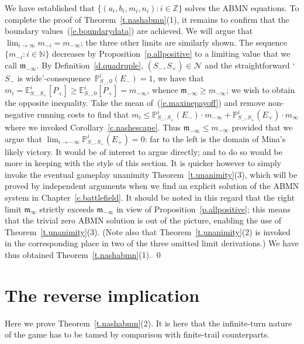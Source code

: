 \documentclass[letterpaper,11pt,oneside,reqno]{amsbook}
\newcommand{\PP}{\ensuremath{\mathbb{P}}}
\newcommand{\N}{\ensuremath{\mathbb{N}}}
\newcommand{\Z}{\ensuremath{\mathbb{Z}}}
\newcommand{\E}[0]{\mathbb{E}}
\numberwithin{figure}{chapter}
\newtheorem{proposition}[theorem]{Proposition}
\theoremstyle{definition}
\theoremstyle{definition}
\theoremstyle{definition}
\theoremstyle{definition}
\theoremstyle{definition}
\newcommand{\mc}{\mathcal}
\newcommand{\nwithzero}{\N}
\newcommand\pgameplay[3]{\PP^{#3}_{#1,#2}}
\newcommand\egameplay[3]{\E^{#3}_{#1,#2}}
\newcommand{\abmnmacspace}{\textrm{ABMN} }
\begin{document}
We have established that $\big\{ (a_i,b_i,m_i,n_i): i \in \Z \big\}$
solves the \abmnmacspace equations. 
To complete the proof of Theorem~\ref{t.nashabmn}(1), it remains to confirm that the boundary values~(\ref{e.boundarydata}) are achieved.
We will argue that $\lim_{i \to \infty} m_{-i} = m_{-\infty}$; the three other limits are similarly shown. 
The sequence $\big\{ m_{-i}: i \in \nwithzero \big\}$ decreases by Proposition~\ref{p.allpositive} to a limiting value that we call $\mathfrak{m}_{-\infty}$.
By Definition~\ref{d.quadruple}, $(S_-,S_+) \in \mc{N}$ and the straightforward `$S_-$ is wide'-consequence~$\pgameplay{S_-}{0}{i} (E_-)=1$, we have that $m_i = \egameplay{S_-}{S_+}{i} [P_+] \geq \egameplay{S_-}{0}{i} [P_+] = m_{-\infty}$, whence $\mathfrak{m}_{-\infty} \geq m_{-\infty}$; we wish to obtain the opposite inequality. Take the mean of~(\ref{e.maxinepayoff}) and
 remove non-negative running costs to find that $m_i \leq \pgameplay{S_-}{S_+}{i}(E_-)\cdot m_{-\infty} +  \pgameplay{S_-}{S_+}{i}(E_+) \cdot m_\infty$  where we invoked Corollary~\ref{c.nashescape}.
 Thus $\mathfrak{m}_{-\infty} \leq m_{-\infty}$ provided that we argue that  $\lim_{i \to -\infty} \pgameplay{S_-}{S_+}{i}(E_+) = 0$: far to the left is the domain of Mina's likely victory. It would be of interest to argue directly; and to do so would be more in keeping with the style of this section. It is quicker however to simply invoke the eventual gameplay unanimity Theorem~\ref{t.unanimity}(3), which will be proved by independent arguments when we find an explicit solution of the \abmnmacspace system in Chapter~\ref{c.battlefield}. 
It should be noted in this regard that the right limit $\mathfrak{m}_\infty$ strictly exceeds $\mathfrak{m}_{-\infty}$ in view of Proposition~\ref{p.allpositive}; this means that the trivial zero  \abmnmacspace solution is out of the picture, enabling the use of  Theorem~\ref{t.unanimity}(3).
(Note also that Theorem~\ref{t.unanimity}(2) is invoked in the corresponding place in two of the three omitted limit derivations.)
We have thus obtained   Theorem~\ref{t.nashabmn}(1).
  \qed
 



\section{The reverse implication}
Here we prove Theorem~\ref{t.nashabmn}(2). It is here that the infinite-turn nature of the game has to be tamed by comparison with finite-trail counterparts.
\end{document}
